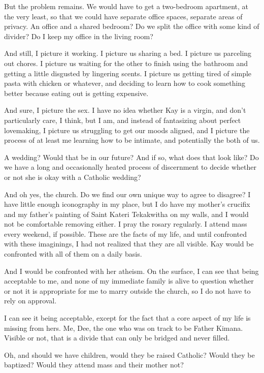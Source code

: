 But the problem remains. We would have to get a two-bedroom apartment, at the very least, so that we could have separate office spaces, separate areas of privacy. An office and a shared bedroom? Do we split the office with some kind of divider? Do I keep my office in the living room?

And still, I picture it working. I picture us sharing a bed. I picture us parceling out chores. I picture us waiting for the other to finish using the bathroom and getting a little disgusted by lingering scents. I picture us getting tired of simple pasta with chicken or whatever, and deciding to learn how to cook something better because eating out is getting expensive.

And sure, I picture the sex. I have no idea whether Kay is a virgin, and don't particularly care, I think, but I am, and instead of fantasizing about perfect lovemaking, I picture us struggling to get our moods aligned, and I picture the process of at least me learning how to be intimate, and potentially the both of us.

A wedding? Would that be in our future? And if so, what does that look like? Do we have a long and occasionally heated process of discernment to decide whether or not she is okay with a Catholic wedding?

And oh yes, the church. Do we find our own unique way to agree to disagree? I have little enough iconography in my place, but I do have my mother's crucifix and my father's painting of Saint Kateri Tekakwitha on my walls, and I would not be comfortable removing either. I pray the rosary regularly. I attend mass every weekend, if possible. These are the facts of my life, and until confronted with these imaginings, I had not realized that they are all visible. Kay would be confronted with all of them on a daily basis.

And I would be confronted with her atheism. On the surface, I can see that being acceptable to me, and none of my immediate family is alive to question whether or not it is appropriate for me to marry outside the church, so I do not have to rely on approval.

I can see it being acceptable, except for the fact that a core aspect of my life is missing from hers. Me, Dee, the one who was on track to be Father Kimana. Visible or not, that is a divide that can only be bridged and never filled.

Oh, and should we have children, would they be raised Catholic? Would they be baptized? Would they attend mass and their mother not?

